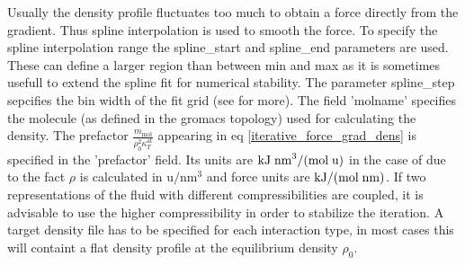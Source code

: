 Usually the density profile fluctuates too much to obtain a force directly from the gradient. Thus spline interpolation is used to smooth the force. To specify the spline interpolation range the spline\_start and spline\_end parameters are used. These can define a larger region than between min and max as it is sometimes usefull to extend the spline fit for numerical stability. The parameter spline\_step sepcifies the bin width of the fit grid (see  for more). 
The field 'molname' specifies the molecule (as defined in the gromacs topology) used for calculating the density. 
The prefactor $\frac{m_\text{mol}}{\rho_0^2 \kappa_T^\text{at}}$ appearing in eq \ref{iterative_force_grad_dens} is specified in the 'prefactor' field. Its units are $\text{kJ\;nm}^3/(\text{mol\;u})$ in the case of \gromacs due to the fact $\rho$ is calculated in $\text{u}/\text{nm}^3$ and force units are $\text{kJ}/(\text{mol\;nm})$. If two representations of the fluid with different compressibilities are coupled, it is advisable to use the higher compressibility in order to stabilize the iteration.
A target density file has to be specified for each interaction type, in most cases this will containt a flat density profile at the equilibrium density $\rho_0$. \\
